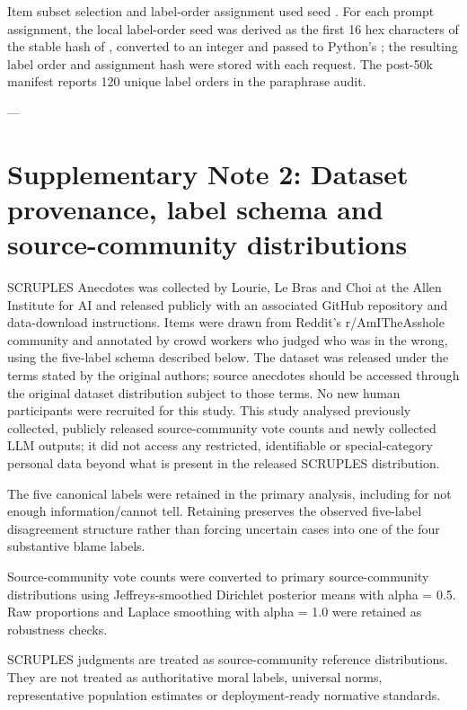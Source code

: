 \documentclass[11pt]{article}
\begin{document}
Item subset selection and label-order assignment used seed . For each prompt assignment, the local label-order seed was derived as the first 16 hex characters of the stable hash of , converted to an integer and passed to Python's ; the resulting label order and assignment hash were stored with each request. The post-50k manifest reports 120 unique label orders in the paraphrase audit.

---

\section{Supplementary Note 2: Dataset provenance, label schema and source-community distributions}

SCRUPLES Anecdotes was collected by Lourie, Le Bras and Choi at the Allen Institute for AI and released publicly with an associated GitHub repository and data-download instructions. Items were drawn from Reddit's r/AmITheAsshole community and annotated by crowd workers who judged who was in the wrong, using the five-label schema described below. The dataset was released under the terms stated by the original authors; source anecdotes should be accessed through the original dataset distribution subject to those terms. No new human participants were recruited for this study. This study analysed previously collected, publicly released source-community vote counts and newly collected LLM outputs; it did not access any restricted, identifiable or special-category personal data beyond what is present in the released SCRUPLES distribution.

The five canonical labels were retained in the primary analysis, including  for not enough information/cannot tell. Retaining  preserves the observed five-label disagreement structure rather than forcing uncertain cases into one of the four substantive blame labels.

Source-community vote counts were converted to primary source-community distributions using Jeffreys-smoothed Dirichlet posterior means with alpha = 0.5. Raw proportions and Laplace smoothing with alpha = 1.0 were retained as robustness checks.

SCRUPLES judgments are treated as source-community reference distributions. They are not treated as authoritative moral labels, universal norms, representative population estimates or deployment-ready normative standards.
\end{document}
